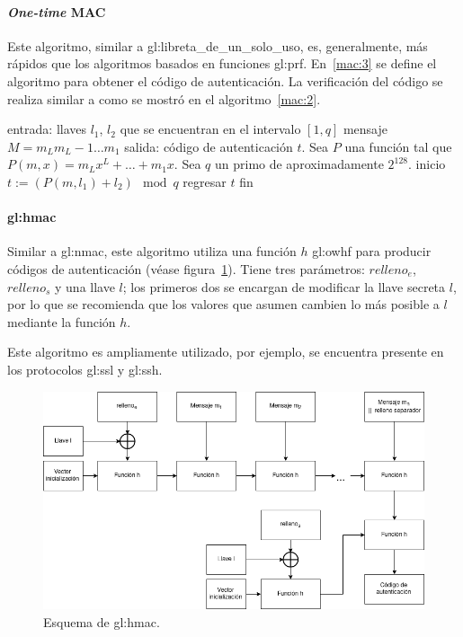 \paragraph{\textit{One-time} MAC}
Este algoritmo, similar a \gls{gl:libreta_de_un_solo_uso}, es, generalmente,
más rápidos que los algoritmos basados en funciones \gls{gl:prf}. En~\ref{mac:3}
se define el algoritmo para obtener el código de autenticación. La verificación
del código se realiza similar a como se mostró en el algoritmo~\ref{mac:2}.

\begin{pseudocodigo}[caption={MAC mediante \textit{One-time} MAC.},
  label={mac:3}]
    entrada:    llaves $l_1$, $l_2$ que se encuentran en el intervalo $[1,q]$
                mensaje $M = m_L m_L-1 \dots m_1$
    salida:     código de autenticación $t$.
    Sea $P$ una función tal que $P(m, x) = m_Lx^L + \dots + m_1x$.
    Sea $q$ un primo de aproximadamente $2^{128}$.
    inicio
      $t := (P(m, l_1) + l_2) \mod q$
      regresar $t$
    fin
\end{pseudocodigo}

\paragraph{\acrlong{gl:hmac}}
Similar a \gls{gl:nmac}, este algoritmo utiliza una función $h$ \gls{gl:owhf}
para producir códigos de autenticación (véase figura~\ref{mac:hmac}).
Tiene tres parámetros: $relleno_e$, $relleno_s$ y una llave $l$; los primeros
dos se encargan de modificar la llave secreta $l$, por lo que se recomienda que
los valores que asumen cambien lo más posible a $l$ mediante la función $h$.

Este algoritmo es ampliamente utilizado, por ejemplo, se encuentra presente en
los protocolos \gls{gl:ssl} y \gls{gl:ssh}.

\begin{figure}
  \begin{center}
    \includegraphics[width=0.9\linewidth]{diagramas/hmac.png}
    \caption{Esquema de \acrshort{gl:hmac}.}
    \label{mac:hmac}
  \end{center}
\end{figure}
